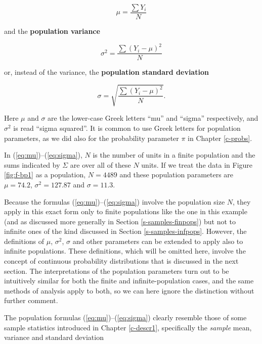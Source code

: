 \documentclass[11pt,a4paper,openany]{book}
\begin{document}
\begin{equation}\mu=\frac{\sum Y_{i}}{N}
\label{eq:mu}\end{equation}

and the \textbf{population variance}

\begin{equation}\sigma^{2} = \frac{\sum (Y_{i}-\mu)^{2}}{N}
\label{eq:sigma2}\end{equation}

or, instead of the variance, the \textbf{population standard deviation}

\begin{equation}\sigma = \sqrt{\frac{\sum (Y_{i}-\mu)^{2}}{N}}.
\label{eq:sigma}\end{equation}

Here \(\mu\) and \(\sigma\) are the lower-case Greek letters ``mu'' and
``sigma'' respectively, and \(\sigma^{2}\) is read ``sigma squared''. It
is common to use Greek letters for population parameters, as we did also
for the probability parameter \(\pi\) in Chapter \ref{c-probs}.

In (\ref{eq:mu})--(\ref{eq:sigma}), \(N\) is the number of units in a
finite population and the sums indicated by \(\Sigma\) are over all of
these \(N\) units. If we treat the data in Figure \ref{fig:f-bp1} as a
population, \(N=4489\) and these population parameters are \(\mu=74.2\),
\(\sigma^{2}=127.87\) and \(\sigma=11.3\).

Because the formulas (\ref{eq:mu})--(\ref{eq:sigma}) involve the
population size \(N\), they apply in this exact form only to finite
populations like the one in this example (and as discussed more
generally in Section \ref{s-samples-finpops}) but not to infinite ones
of the kind discussed in Section \ref{s-samples-infpops}. However, the
definitions of \(\mu\), \(\sigma^{2}\), \(\sigma\) and other parameters
can be extended to apply also to infinite populations. These
definitions, which will be omitted here, involve the concept of
continuous probability distributions that is discussed in the next
section. The interpretations of the population parameters turn out to be
intuitively similar for both the finite and infinite-population cases,
and the same methods of analysis apply to both, so we can here ignore
the distinction without further comment.

The population formulas (\ref{eq:mu})--(\ref{eq:sigma}) clearly resemble
those of some sample statistics introduced in Chapter \ref{c-descr1},
specifically the \emph{sample} mean, variance and standard deviation
\end{document}
